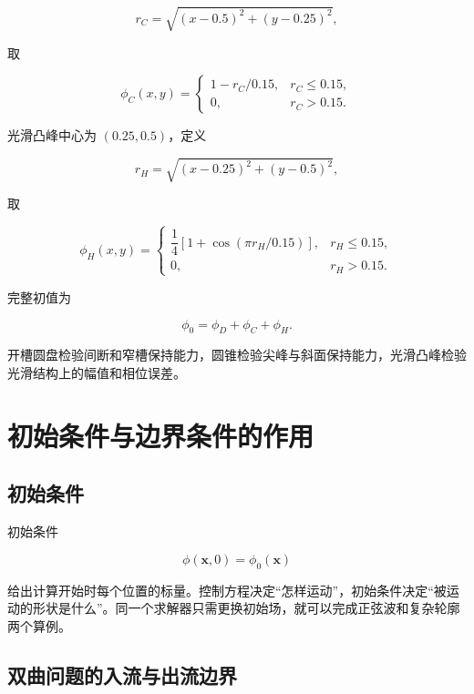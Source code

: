 \documentclass[UTF8,12pt,a4paper,fontset=fandol]{ctexart}
\numberwithin{equation}{section}
\newcommand{\xf}{\bm x}
\begin{document}
\begin{equation}
  r_C=\sqrt{(x-0.5)^2+(y-0.25)^2},
\end{equation}

取

\begin{equation}
  \phi_C(x,y)=
  \begin{cases}
  1-r_C/0.15,&r_C\leq0.15,\\
  0,&r_C>0.15.
  \end{cases}
\end{equation}

光滑凸峰中心为 $(0.25,0.5)$，定义

\begin{equation}
  r_H=\sqrt{(x-0.25)^2+(y-0.5)^2},
\end{equation}

取

\begin{equation}
  \phi_H(x,y)=
  \begin{cases}
  \dfrac14\left[1+\cos\left(\pi r_H/0.15\right)\right],
  &r_H\leq0.15,\\[2mm]
  0,&r_H>0.15.
  \end{cases}
\end{equation}

完整初值为

\begin{equation}
  \phi_0=\phi_D+\phi_C+\phi_H.
\end{equation}

开槽圆盘检验间断和窄槽保持能力，圆锥检验尖峰与斜面保持能力，光滑凸峰检验光滑结构上的幅值和相位误差。

\section{初始条件与边界条件的作用}

\subsection{初始条件}

初始条件

\begin{equation}
  \phi(\xf,0)=\phi_0(\xf)
\end{equation}

给出计算开始时每个位置的标量。控制方程决定“怎样运动”，初始条件决定“被运动的形状是什么”。同一个求解器只需更换初始场，就可以完成正弦波和复杂轮廓两个算例。

\subsection{双曲问题的入流与出流边界}
\end{document}
